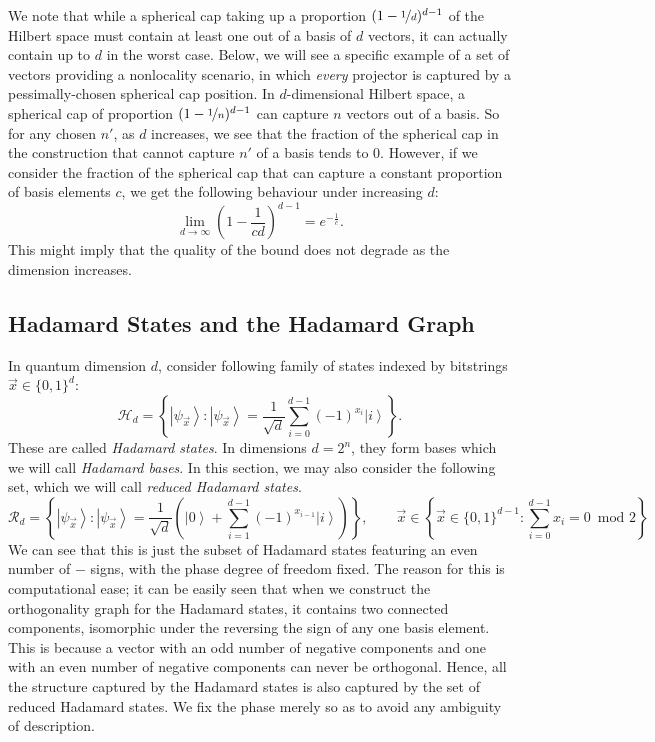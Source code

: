\documentclass{amsart}
\theoremstyle{definition}
\newcommand{\ket}[1]{{\left\vert{#1}\right\rangle}}
\begin{document}
We note that while a spherical cap taking up a proportion $(1-\nicefrac1d)^{d-1}$ of the Hilbert space must contain at least one out of a basis of $d$ vectors, it can actually contain up to $d$ in the worst case. Below, we will see a specific example of a set of vectors providing a nonlocality scenario, in which \emph{every} projector is captured by a pessimally-chosen spherical cap position. In $d$-dimensional Hilbert space, a spherical cap of proportion $(1-\nicefrac1n)^{d-1}$ can capture $n$ vectors out of a basis. So for any chosen $n'$, as $d$ increases, we see that the fraction of the spherical cap in the construction that cannot capture $n'$ of a basis tends to 0. However, if we consider the fraction of the spherical cap that can capture a constant proportion of basis elements $c$, we get the following behaviour under increasing $d$: %
\begin{equation}
\lim_{d\rightarrow\infty} \left(1-\frac{1}{cd}\right)^{d-1}=e^{-\frac1c}.
\end{equation}
This might imply that the quality of the bound does not degrade as the dimension increases.%


\subsection{Hadamard States and the Hadamard Graph}

In quantum dimension $d$, consider following family of states indexed by bitstrings $\vec{x}\in\{0,1\}^d$:
\begin{equation}
\mathcal{H}_d=\left\{ \ket{\psi_{\vec{x}}}:\ket{\psi_{\vec{x}}} = \frac{1}{\sqrt{d}}\sum_{i=0}^{d-1}(-1)^{x_i}\ket{i}  \right\}.
\end{equation}
These are called \emph{Hadamard states}. In dimensions $d=2^n$, they form bases which we will call \emph{Hadamard bases}. In this section, we may also consider the following set, which we will call \emph{reduced Hadamard states}.
\begin{equation}
\mathcal{R}_d=\left\{ \ket{\psi_{\vec{x}}}:\ket{\psi_{\vec{x}}} = \frac{1}{\sqrt{d}}\left(\ket{0}+\sum_{i=1}^{d-1}(-1)^{x_{i-1}}\ket{i}  \right)\right\}, \qquad\vec{x}\in\left\{\vec{x}\in\{0,1\}^{d-1}:\sum_{i=0}^{d-1} x_i =0 \enspace \mbox{mod 2}\right\}
\end{equation}
We can see that this is just the subset of Hadamard states featuring an even number of $-$ signs, with the phase degree of freedom fixed. The reason for this is computational ease; it can be easily seen that when we construct the orthogonality graph for the Hadamard states, it contains two connected components, isomorphic under the reversing the sign of any one basis element. This is because a vector with an odd number of negative components and one with an even number of negative components can never be orthogonal. Hence, all the structure captured by the Hadamard states is also captured by the set of reduced Hadamard states. We fix the phase merely so as to avoid any ambiguity of description.
\end{document}
